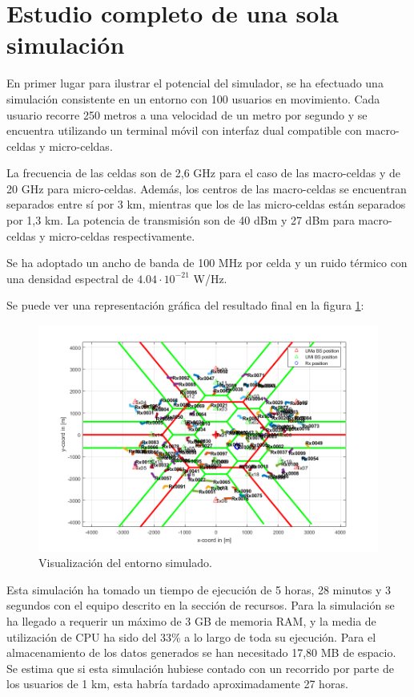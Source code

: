 \section{Estudio completo de una sola simulación}

En primer lugar para ilustrar el potencial del simulador, se ha efectuado una simulación consistente en un entorno con 100 usuarios en movimiento. Cada usuario recorre 250 metros a una velocidad de un metro por segundo y se encuentra utilizando un terminal móvil con interfaz dual compatible con macro-celdas y micro-celdas.

La frecuencia de las celdas son de 2,6 GHz para el caso de las macro-celdas y de 20 GHz para micro-celdas. Además, los centros de las macro-celdas se encuentran separados entre sí por 3 km, mientras que los de las micro-celdas están separados por 1,3 km. La potencia de transmisión son de 40 dBm y 27 dBm para macro-celdas y micro-celdas respectivamente.

Se ha adoptado un ancho de banda de 100 MHz por celda y un ruido térmico con una densidad espectral de $4.04·10^{-21}$ W/Hz. 

Se puede ver una representación gráfica del resultado final en la figura \ref{fig:simulacion_completa_entorno}:

\begin{figure}[h!]
	\centering
    \includegraphics[width=0.8\linewidth]{imagenes/6_2_entorno.png}
	\caption{Visualización del entorno simulado.}
	\label{fig:simulacion_completa_entorno}
\end{figure}

Esta simulación ha tomado un tiempo de ejecución de 5 horas, 28 minutos y 3 segundos con el equipo descrito en la sección de recursos. Para la simulación se ha llegado a requerir un máximo de 3 GB de memoria RAM, y la media de utilización de CPU ha sido del 33\% a lo largo de toda su ejecución. Para el almacenamiento de los datos generados se han necesitado 17,80 MB de espacio. Se estima que si esta simulación hubiese contado con un recorrido por parte de los usuarios de 1 km, esta habría tardado aproximadamente 27 horas.

